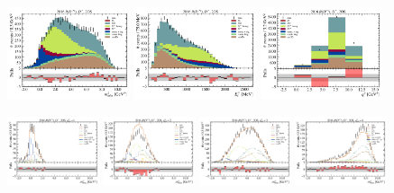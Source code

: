\begin{figure}[htb]
    \centering
    \includegraphics[width=0.32\textwidth]{./figs-supplemental-plots/pre-ctrl-fit/stacked/fit_result-stacked-Dst-2os-mmiss2.pdf}
    \includegraphics[width=0.32\textwidth]{./figs-supplemental-plots/pre-ctrl-fit/stacked/fit_result-stacked-Dst-2os-el.pdf}
    \includegraphics[width=0.32\textwidth]{./figs-supplemental-plots/pre-ctrl-fit/stacked/fit_result-stacked-Dst-2os-q2.pdf}

    \includegraphics[width=0.24\textwidth]{./figs-supplemental-plots/pre-ctrl-fit/lines_q2_slices/fit_result-lines_q2_idx1-Dst-2os-mmiss2.pdf}
    \includegraphics[width=0.24\textwidth]{./figs-supplemental-plots/pre-ctrl-fit/lines_q2_slices/fit_result-lines_q2_idx2-Dst-2os-mmiss2.pdf}
    \includegraphics[width=0.24\textwidth]{./figs-supplemental-plots/pre-ctrl-fit/lines_q2_slices/fit_result-lines_q2_idx3-Dst-2os-mmiss2.pdf}
    \includegraphics[width=0.24\textwidth]{./figs-supplemental-plots/pre-ctrl-fit/lines_q2_slices/fit_result-lines_q2_idx4-Dst-2os-mmiss2.pdf}


\end{figure}
